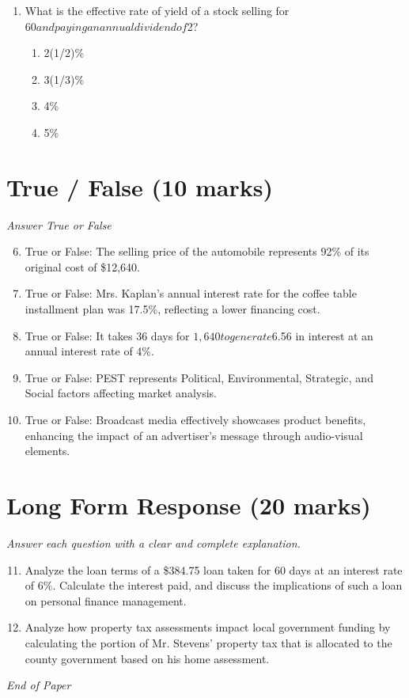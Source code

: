 \documentclass[12pt]{article}
\begin{document}
\begin{enumerate}[label=\arabic*.]
\begin{enumerate}[label=(\alph*)]
    \item \$1,200
    \item \$1,215.75
    \item \$1,230.50
    \item \$1,235.00
    \item \$1,242.50
\end{enumerate}
\item What is the effective rate of yield of a stock selling for $60 and paying an annual dividend of $2?
\begin{enumerate}[label=(\alph*)]
    \item 2(1/2)\%
    \item 3(1/3)\%
    \item 4\%
    \item 5\%
\end{enumerate}
\end{enumerate}

\section*{True / False (10 marks)}
\textit{Answer True or False}
\begin{enumerate}[label=\arabic*.]
\setcounter{enumi}{5}
\item True or False: The selling price of the automobile represents 92\% of its original cost of \$12,640.
\item True or False: Mrs. Kaplan's annual interest rate for the coffee table installment plan was 17.5\%, reflecting a lower financing cost.
\item True or False: It takes 36 days for $1,640 to generate $6.56 in interest at an annual interest rate of 4\%.
\item True or False: PEST represents Political, Environmental, Strategic, and Social factors affecting market analysis.
\item True or False: Broadcast media effectively showcases product benefits, enhancing the impact of an advertiser's message through audio-visual elements.
\end{enumerate}

\section*{Long Form Response (20 marks)}
\textit{Answer each question with a clear and complete explanation.}
\begin{enumerate}[label=\arabic*.]
\setcounter{enumi}{10}
\item Analyze the loan terms of a \$384.75 loan taken for 60 days at an interest rate of 6\%. Calculate the interest paid, and discuss the implications of such a loan on personal finance management.
\item Analyze how property tax assessments impact local government funding by calculating the portion of Mr. Stevens' property tax that is allocated to the county government based on his home assessment.
\end{enumerate}

\vfill
\noindent\textit{End of Paper}
\end{document}
